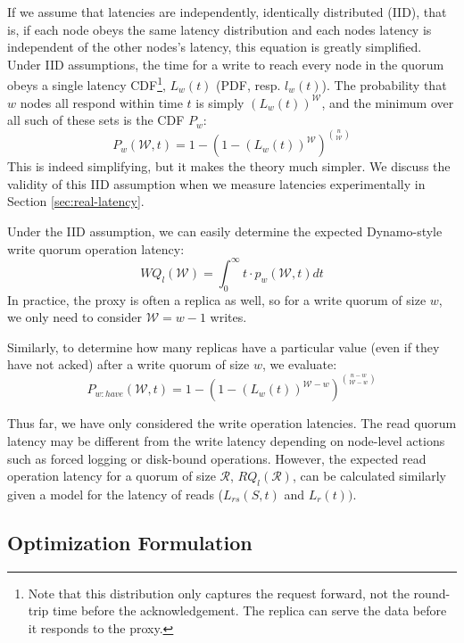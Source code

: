 \documentclass{vldb}
\begin{document}
If we assume that latencies are independently, identically distributed
(IID), that is, if each node obeys the same latency distribution and
each nodes latency is independent of the other nodes's latency, this
equation is greatly simplified.  Under IID assumptions, the time for a
write to reach every node in the quorum obeys a single latency
CDF\footnote{Note that this distribution only captures the request
  forward, not the round-trip time before the acknowledgement.  The
  replica can serve the data before it responds to the proxy.},
$L_w(t)$ (PDF, resp. $l_w(t)$).  The probability that $w$ nodes all
respond within time $t$ is simply $(L_w(t))^\mathcal{W}$, and the
minimum over all such of these sets is the CDF $P_w$:
\begin{equation}
P_w(\mathcal{W}, t) = 1-(1-(L_w(t))^\mathcal{W})^{n \choose \mathcal{W}}
\end{equation}
This is indeed simplifying, but it makes the theory much simpler.  We
discuss the validity of this IID assumption when we measure latencies
experimentally in Section \ref{sec:real-latency}.

Under the IID assumption, we can easily determine the expected
Dynamo-style write quorum operation latency:
\begin{equation}
WQ_l(\mathcal{W}) = \int_0^{\infty} t \cdot p_w(\mathcal{W}, t) dt
\end{equation}
In practice, the proxy is often a replica as well, so for a write
quorum of size $w$, we only need to consider $\mathcal{W}=w-1$ writes.

Similarly, to determine how many replicas have a particular value (even if they have not acked) after a write quorum of size $w$, we evaluate:
\begin{equation}
P_{w:have}(\mathcal{W}, t) = 1-(1-(L_w(t))^{\mathcal{W}-w})^{n-w \choose \mathcal{W}-w}
\end{equation}

Thus far, we have only considered the write operation latencies.  The
read quorum latency may be different from the write latency depending
on node-level actions such as forced logging or disk-bound operations.
However, the expected read operation latency for a quorum of size
$\mathcal{R}$, $RQ_l(\mathcal{R})$, can be calculated similarly given a
model for the latency of reads ($L_{rs}(S,t)$ and $L_r(t))$.

\subsection{Optimization Formulation}
\end{document}
